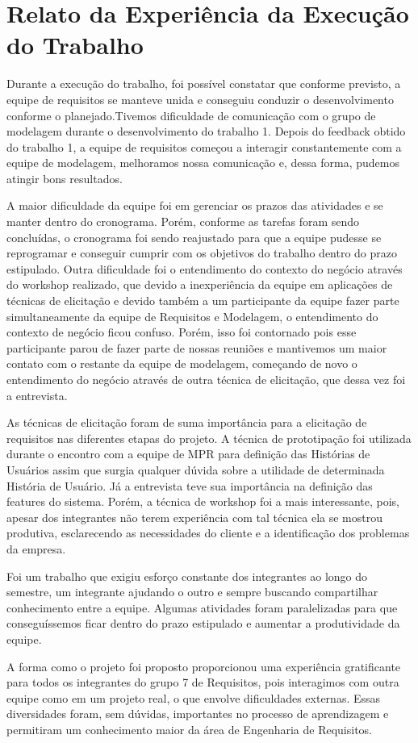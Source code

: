 \section{Relato da Experiência da Execução do Trabalho}
	Durante a execução do trabalho, foi possível constatar que conforme previsto, a equipe de requisitos se manteve unida e conseguiu conduzir o desenvolvimento conforme o planejado.Tivemos dificuldade de comunicação com o grupo de modelagem durante o desenvolvimento do trabalho 1. Depois do feedback obtido do trabalho 1, a equipe de requisitos começou a interagir constantemente com a equipe de modelagem, melhoramos nossa comunicação e, dessa forma, pudemos atingir bons resultados.
	
	A maior dificuldade da equipe foi em gerenciar os prazos das atividades e se manter dentro do cronograma. Porém, conforme as tarefas foram sendo concluídas, o cronograma foi sendo reajustado para que a equipe pudesse se reprogramar e conseguir cumprir com os objetivos do trabalho dentro do prazo estipulado.
	Outra dificuldade foi o entendimento do contexto do negócio através do workshop realizado, que devido a inexperiência da equipe em aplicações de técnicas de elicitação e devido também a um participante da equipe fazer parte simultaneamente da equipe de Requisitos e Modelagem, o entendimento do contexto de negócio ficou confuso. Porém, isso foi contornado pois esse participante parou de fazer parte de nossas reuniões e mantivemos um maior contato com o restante da equipe de modelagem, começando de novo o entendimento do negócio através de outra técnica de elicitação, que dessa vez foi a entrevista.
	
	As técnicas de elicitação foram de suma importância para a elicitação de requisitos nas diferentes etapas do projeto. A técnica de prototipação foi utilizada durante o encontro com a equipe de MPR para definição das Histórias de Usuários assim que surgia qualquer dúvida sobre a utilidade de determinada História de Usuário. Já a entrevista teve sua importância na definição das features do sistema. Porém, a técnica de workshop foi a mais interessante, pois, apesar dos integrantes não terem experiência com tal técnica ela se mostrou produtiva, esclarecendo as necessidades do cliente e a identificação dos problemas da empresa.
	
	Foi um trabalho que exigiu esforço constante dos integrantes ao longo do semestre, um integrante ajudando o outro e sempre buscando compartilhar conhecimento entre a equipe. Algumas atividades foram paralelizadas para que conseguíssemos ficar dentro do prazo estipulado e aumentar a produtividade da equipe.
	
	A forma como o projeto foi proposto proporcionou uma experiência gratificante para todos os integrantes do grupo 7 de Requisitos, pois interagimos com outra equipe como em um projeto real, o que envolve dificuldades externas. Essas diversidades foram, sem dúvidas, importantes no processo de aprendizagem e permitiram um conhecimento maior da área de Engenharia de Requisitos.